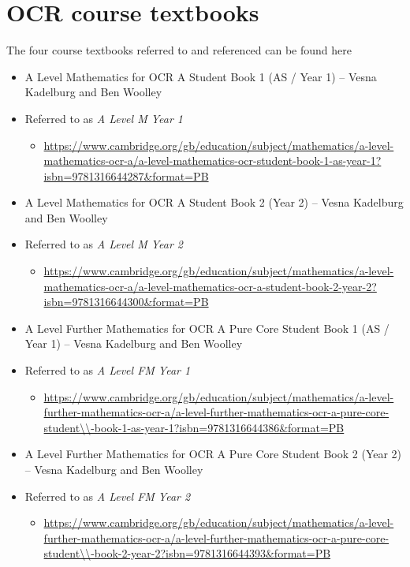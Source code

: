 \documentclass[11pt, a4paper]{article}
\begin{document}
\clearpage
\appendix
\appendixpage
\sloppy
\section{OCR course textbooks}
The four course textbooks referred to and referenced can be found here
\begin{itemize}
\item A Level Mathematics for OCR A Student Book 1 (AS / Year 1) -- Vesna Kadelburg and Ben Woolley
\item [] Referred to as \emph{A Level M Year 1}
\begin{itemize}
\item[] \url{https://www.cambridge.org/gb/education/subject/mathematics/a-level-mathematics-ocr-a/a-level-mathematics-ocr-student-book-1-as-year-1?isbn=9781316644287&format=PB}
\end{itemize}
\vspace{.3cm}
\item A Level Mathematics for OCR A Student Book 2 (Year 2) -- Vesna Kadelburg and Ben Woolley
\item [] Referred to as \emph{A Level M Year 2}
\begin{itemize}
\item[] \url{https://www.cambridge.org/gb/education/subject/mathematics/a-level-mathematics-ocr-a/a-level-mathematics-ocr-a-student-book-2-year-2?isbn=9781316644300&format=PB}
\end{itemize}
\vspace{.3cm}
\item A Level Further Mathematics for OCR A Pure Core Student Book 1 (AS / Year 1) -- Vesna Kadelburg and Ben Woolley
\item [] Referred to as \emph{A Level FM Year 1}
\begin{itemize}
\item[] \url{https://www.cambridge.org/gb/education/subject/mathematics/a-level-further-mathematics-ocr-a/a-level-further-mathematics-ocr-a-pure-core-student\\-book-1-as-year-1?isbn=9781316644386&format=PB}
\end{itemize}
\vspace{.3cm}
\item A Level Further Mathematics for OCR A Pure Core Student Book 2 (Year 2) -- Vesna Kadelburg and Ben Woolley
\item [] Referred to as \emph{A Level FM Year 2}
\begin{itemize}
\item[] \url{https://www.cambridge.org/gb/education/subject/mathematics/a-level-further-mathematics-ocr-a/a-level-further-mathematics-ocr-a-pure-core-student\\-book-2-year-2?isbn=9781316644393&format=PB}
\end{itemize}
\end{itemize}
\end{document}
